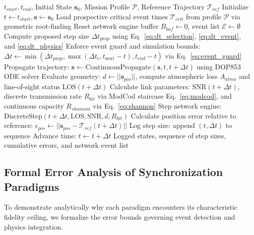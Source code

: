 \documentclass[a4paper,fleqn]{cas-sc}
\begin{document}
\begin{algorithm}
\caption{Adaptive Multi-Rate Co-Simulation Orchestrator}
\label{alg:orchestrator}
\begin{algorithmic}[1]
\REQUIRE $t_{start}, t_{end}$, Initial State $\mathbf{s}_0$, Mission Profile $\mathcal{P}$, Reference Trajectory $\mathcal{T}_{ref}$
\STATE Initialize $t \leftarrow t_{start}, \mathbf{s} \leftarrow \mathbf{s}_0$
\STATE Load prospective critical event times $\mathcal{T}_{crit}$ from profile $\mathcal{P}$ via geometric root-finding
\STATE Reset network engine buffer $B_{buf} \leftarrow 0$, event list $\mathcal{E} \leftarrow \emptyset$
    \STATE Compute proposed step size $\Delta t_{\text{prop}}$ using Eq.~\eqref{eq:dt_selection}, \eqref{eq:dt_event}, and \eqref{eq:dt_physics}
    \STATE Enforce event guard and simulation bounds: $\Delta t \leftarrow \min\left(\Delta t_{\text{prop}}, \max(\Delta t_{\epsilon}, t_{\text{next}} - t), t_{end} - t\right)$ via Eq.~\eqref{eq:event_guard}
    \STATE Propagate trajectory: $\mathbf{s} \leftarrow \text{ContinuousPropagate}(\mathbf{s}, t, t + \Delta t)$ using DOP853 ODE solver
    \STATE Evaluate geometry: $d \leftarrow ||\mathbf{s}_{pos}||$, compute atmospheric loss $A_{atmo}$ and line-of-sight status $\text{LOS}(t+\Delta t)$
    \STATE Calculate link parameters: $\text{SNR}(t+\Delta t)$, discrete transmission rate $R_{bit}$ via ModCod staircase Eq.~\eqref{eq:modcod}, and continuous capacity $R_{shannon}$ via Eq.~\eqref{eq:shannon}
    \STATE Step network engine: $\text{DiscreteStep}(t+\Delta t, \text{LOS}, \text{SNR}, d, R_{bit})$
    \STATE Calculate position error relative to reference: $\epsilon_{pos} \leftarrow ||\mathbf{s}_{pos} - \mathcal{T}_{ref}(t+\Delta t)||$
    \STATE Log step size: append $(t, \Delta t)$ to sequence
    \STATE Advance time: $t \leftarrow t + \Delta t$
\ENDWHILE
\RETURN Logged states, sequence of step sizes, cumulative errors, and network event list
\end{algorithmic}
\end{algorithm}



\subsection{Formal Error Analysis of Synchronization Paradigms}
To demonstrate analytically why each paradigm encounters its characteristic fidelity ceiling, we formalize the error bounds governing event detection and physics integration.
\end{document}
